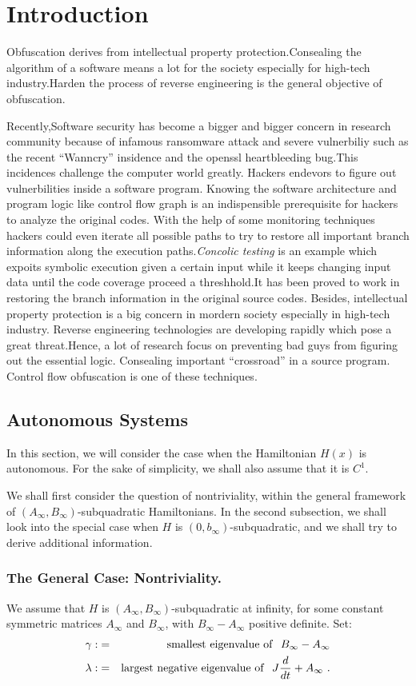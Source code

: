 \documentclass[lnicst]{svmultln}
\begin{document}
\section{Introduction}
%
Obfuscation derives from intellectual property protection.Consealing the algorithm of a software means a lot for the society especially for high-tech industry.Harden the process of reverse engineering is the general objective of obfuscation. 

Recently,Software security has become a bigger and bigger concern in research community because of infamous ransomware attack and severe vulnerbiliy such as the recent ``Wanncry'' insidence and the openssl heartbleeding bug.This incidences challenge the computer world greatly. Hackers endevors to figure out vulnerbilities inside a software program. Knowing the software architecture and program logic like control flow graph is an indispensible prerequisite for hackers to analyze the original codes. With the help of some monitoring techniques hackers could even iterate all possible paths to try to restore all important branch information along the execution paths.\textit{Concolic testing} is an example which expoits symbolic execution given a certain input while it keeps changing input data until the code coverage proceed a threshhold\cite{Sen}.It has been proved to work in restoring the branch information in the original source codes.
Besides, intellectual property protection is a big concern in mordern society especially in high-tech industry. Reverse engineering technologies are developing rapidly which pose a great threat.Hence, a lot of research focus on preventing bad guys from figuring out the essential logic. Consealing important ``crossroad'' in a source program. Control flow obfuscation is one of these techniques.
%
\subsection{Autonomous Systems}
%
In this section, we will consider the case when the Hamiltonian $H(x)$
is autonomous. For the sake of simplicity, we shall also assume that it
is $C^{1}$.

We shall first consider the question of nontriviality, within the
general framework of
$\left(A_{\infty},B_{\infty}\right)$-subquadratic Hamiltonians. In
the second subsection, we shall look into the special case when $H$ is
$\left(0,b_{\infty}\right)$-subquadratic,
and we shall try to derive additional information.
%
\subsubsection{The General Case: Nontriviality.}
%
We assume that $H$ is
$\left(A_{\infty},B_{\infty}\right)$-sub\-qua\-dra\-tic at infinity,
for some constant symmetric matrices $A_{\infty}$ and $B_{\infty}$,
with $B_{\infty}-A_{\infty}$ positive definite. Set:
\begin{eqnarray}
\gamma :&=&{\rm smallest\ eigenvalue\ of}\ \ B_{\infty} - A_{\infty} \\
  \lambda : &=& {\rm largest\ negative\ eigenvalue\ of}\ \
  J \frac{d}{dt} +A_{\infty}\ .
\end{eqnarray}
\end{document}
